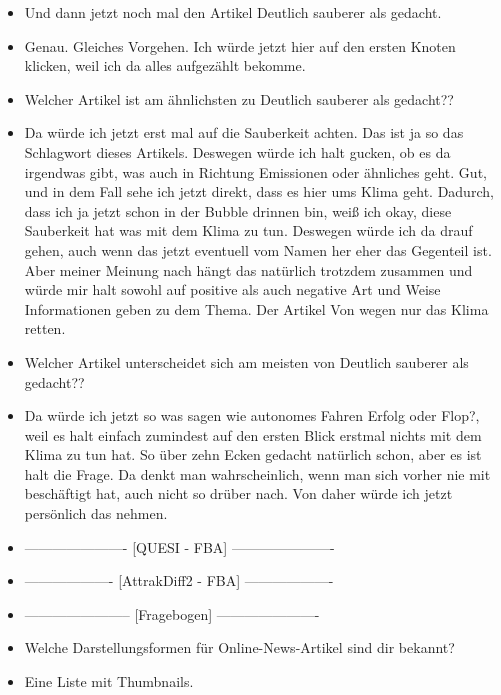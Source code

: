 {\begin{itemize}[]
    Ich war gerade am Überlegen, wie ich am besten alle aufgezählt bekomme, aber dann wahrscheinlich oben mit dem Knoten und dann sehe ich den hier direkt.
    \item {} Und dann jetzt noch mal den Artikel \flqq Deutlich sauberer als gedacht\frqq{}.
    \item {} Genau. Gleiches Vorgehen. Ich würde jetzt hier auf den ersten Knoten klicken, weil ich da alles aufgezählt bekomme.
    \item {} Welcher Artikel ist am ähnlichsten zu \flqq Deutlich sauberer als gedacht?\frqq{}?
    \item {} Da würde ich jetzt erst mal auf die Sauberkeit achten.
    Das ist ja so das Schlagwort dieses Artikels.
    Deswegen würde ich halt gucken, ob es da irgendwas gibt, was auch in Richtung Emissionen oder ähnliches geht.
    Gut, und in dem Fall sehe ich jetzt direkt, dass es hier ums Klima geht.
    Dadurch, dass ich ja jetzt schon in der Bubble drinnen bin, weiß ich okay, diese Sauberkeit hat was mit dem Klima zu tun.
    Deswegen würde ich da drauf gehen, auch wenn das jetzt eventuell vom Namen her eher das Gegenteil ist.
    Aber meiner Meinung nach hängt das natürlich trotzdem zusammen und würde mir halt sowohl auf positive als auch negative Art und Weise Informationen geben zu dem Thema. 
    Der Artikel \flqq Von wegen nur das Klima retten\frqq{}.
    \item {} Welcher Artikel unterscheidet sich am meisten von \flqq Deutlich sauberer als gedacht?\frqq{}?
    \item {} Da würde ich jetzt so was sagen wie \flqq autonomes Fahren Erfolg oder Flop?\frqq{}, weil es halt einfach zumindest auf den ersten Blick erstmal nichts mit dem Klima zu tun hat.
    So über zehn Ecken gedacht natürlich schon, aber es ist halt die Frage.
    Da denkt man wahrscheinlich, wenn man sich vorher nie mit beschäftigt hat, auch nicht so drüber nach.
    Von daher würde ich jetzt persönlich das nehmen.
    \item {----------------------} [QUESI - FBA] {----------------------}
    \item {-------------------} [AttrakDiff2 - FBA] {-------------------}
    \item {-----------------------} [Fragebogen] {----------------------}
    \item {} Welche Darstellungsformen für Online-News-Artikel sind dir bekannt?
    \item {} Eine Liste mit Thumbnails. 

\end{itemize}}
